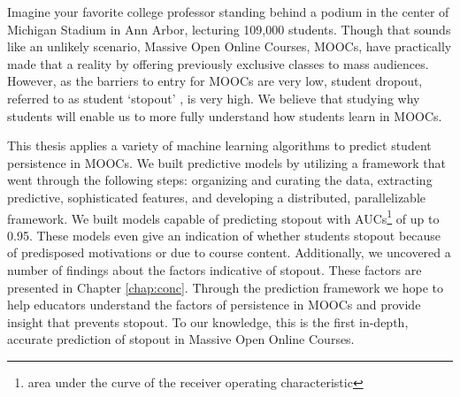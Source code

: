 Imagine your favorite college professor standing behind a podium in the center of Michigan Stadium in Ann Arbor, lecturing 109,000 students. Though that sounds like an unlikely scenario, Massive Open Online Courses, MOOCs, have practically made that a reality by offering previously exclusive classes to mass audiences. However, as the barriers to entry for MOOCs are very low, student dropout, referred to as student `stopout' \cite{breslow2013studying}, is very high. We believe that studying why students \sti will enable us to more fully understand how students learn in MOOCs.

This thesis applies a variety of machine learning algorithms to predict student persistence in MOOCs. We built predictive models by utilizing a framework that went through the following steps: organizing and curating the data, extracting predictive, sophisticated features, and developing a distributed, parallelizable framework. We built models capable of predicting stopout with AUCs\footnote{area under the curve of the receiver operating characteristic} of up to 0.95. These models even give an indication of whether students stopout because of predisposed motivations or due to course content. Additionally, we uncovered a number of findings about the factors indicative of stopout. These factors are presented in Chapter \ref{chap:conc}. Through the prediction framework we hope to help educators understand the factors of persistence in MOOCs and provide insight that prevents stopout. To our knowledge, this is the first in-depth, accurate prediction of stopout in Massive Open Online Courses.